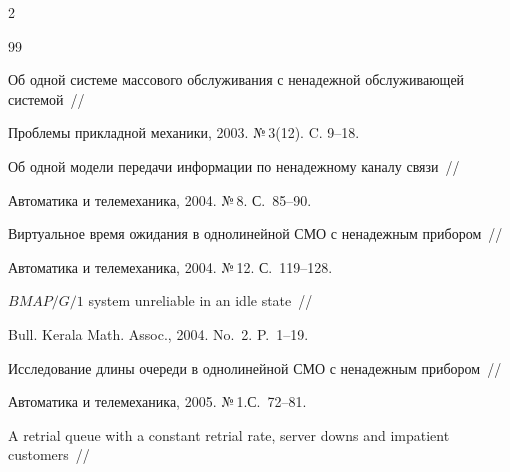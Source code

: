 \begin{multicols}{2}
{{\begin{thebibliography}{99}




Об одной системе массового обслуживания с ненадежной обслуживающей системой~//


Проблемы прикладной механики, 2003. №\,3(12). C. 9--18.









Об одной модели передачи информации по ненадежному каналу связи~//


Автоматика и телемеханика, 2004. №\,8. С.~85--90.












Виртуальное время ожидания в однолинейной СМО с ненадежным прибором~//


Автоматика и телемеханика, 2004. №\,12. С.~119--128.









$BM\!AP/G/1$ system unreliable in an idle state~//


Bull. Kerala Math. Assoc., 2004. No.~2. P.~1--19.









Исследование длины очереди в однолинейной СМО с ненадежным прибором~//


Автоматика и телемеханика, 2005. №\,1.\linebreak С.~72--81.









A retrial queue with a constant retrial rate, server downs and impatient customers~//



\end{thebibliography}}}
\end{multicols}

